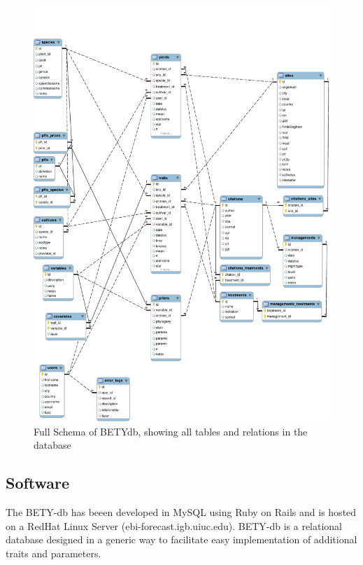 \documentclass[10pt]{article}
\begin{document}
\begin{figure}[hbtp]
\includegraphics[width=\textwidth]{model.pdf}
\caption{Full Schema of BETYdb, showing all tables and relations in the database}
\label{fig:model}
\end{figure}

\subsection{Software}
 The BETY-db has beeen developed in MySQL using Ruby on Rails and is hosted on a RedHat Linux Server (ebi-forecast.igb.uiuc.edu). 
 BETY-db is a relational database designed in a generic way to facilitate easy implementation of additional traits and parameters. 

% 
% 
\end{document}

